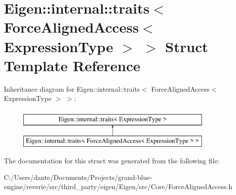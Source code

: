 \hypertarget{struct_eigen_1_1internal_1_1traits_3_01_force_aligned_access_3_01_expression_type_01_4_01_4}{}\section{Eigen\+::internal\+::traits$<$ Force\+Aligned\+Access$<$ Expression\+Type $>$ $>$ Struct Template Reference}
\label{struct_eigen_1_1internal_1_1traits_3_01_force_aligned_access_3_01_expression_type_01_4_01_4}
Inheritance diagram for Eigen\+::internal\+::traits$<$ Force\+Aligned\+Access$<$ Expression\+Type $>$ $>$\+:\begin{figure}[H]
\begin{center}
\leavevmode
\includegraphics[height=2.000000cm]{struct_eigen_1_1internal_1_1traits_3_01_force_aligned_access_3_01_expression_type_01_4_01_4}
\end{center}
\end{figure}


The documentation for this struct was generated from the following file\+:\begin{DoxyCompactItemize}
\item 
C\+:/\+Users/dante/\+Documents/\+Projects/grand-\/blue-\/engine/reverie/src/third\+\_\+party/eigen/\+Eigen/src/\+Core/Force\+Aligned\+Access.\+h\end{DoxyCompactItemize}
